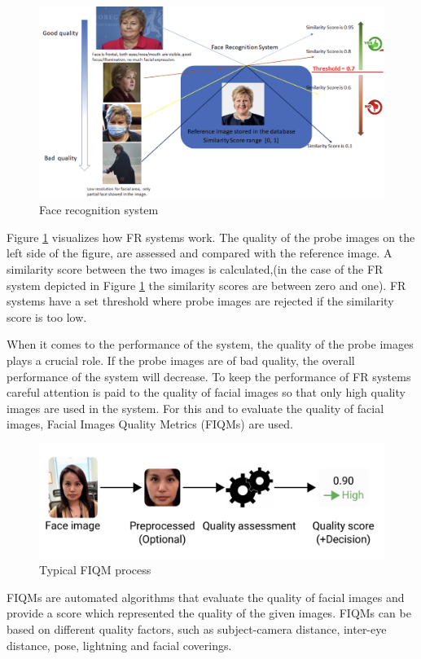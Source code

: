 \begin{figure}[h]
    \centering
    \includegraphics[scale = 0.45]{figures/Erna.png}
    \caption{Face recognition system}
    \label{fig:erna}
\end{figure}

Figure \ref{fig:erna} visualizes how FR systems work. The quality of the probe images on the left side of the figure, are assessed and compared with the reference image. A similarity score between the two images is calculated,(in the case of the FR system depicted in Figure \ref{fig:erna} the similarity scores are between zero and one). FR systems have a set threshold where probe images are rejected if the similarity score is too low. 

When it comes to the performance of the system, the quality of the probe images plays a crucial role. If the probe images are of bad quality, the overall performance of the system will decrease.  To keep the performance of FR systems careful attention is paid to the quality of facial images so that only high quality images are used in the system. For this and to evaluate the quality of facial images, Facial Images Quality Metrics (FIQMs) are used.
%
\begin{figure}[h]
    \centering
    \includegraphics[scale = 0.45]{figures/FIQM.png}
    \caption{Typical FIQM process \cite{FaceImageQualityAssessment}}
    \label{fig:fiqm}
\end{figure}
%
FIQMs are automated algorithms that evaluate the quality of facial images and provide a score which represented the quality of the given images. FIQMs can be based on different quality factors, such as subject-camera distance, inter-eye distance, pose, lightning and facial coverings. %

